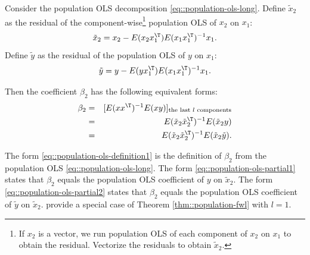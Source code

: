 \begin{theorem}
\label{thm::population-fwl}
Consider the population OLS decomposition \eqref{eq::population-ols-long}. 
Define $\tilde{x}_2$ as the residual of the component-wise\footnote{If $x_2$ is a vector, we run population OLS of each component of $x_2$ on $x_1$ to obtain the residual. Vectorize the residuals to obtain $\tilde{x}_2$.} population OLS of $x_2$ on $x_1$:
$$
\tilde{x}_2 = x_2 - E(x_2 x_1^{\T}) E(x_1 x_1^{\T})^{-1} x_1.
$$
Define $\tilde{y}$ as the residual of the population OLS of $y$ on $x_1$:
$$
\tilde{y} = y - E(y x_1^{\T}) E(x_1 x_1^{\T})^{-1} x_1.
$$

Then the coefficient $\beta_2$ has the following equivalent forms:
\begin{eqnarray}
\beta_2 &=&  [ E(xx^{\T})^{-1} E(xy)]_{\textup{the last $l$ components}} \label{eq::population-ols-definition1} \\
&=& E(\tilde{x}_2\tilde{x}_2^{\T})^{-1} E(\tilde{x}_2 y) \label{eq::population-ols-partial1} \\
&=& E(\tilde{x}_2\tilde{x}_2^{\T})^{-1} E(\tilde{x}_2 \tilde{y}) . \label{eq::population-ols-partial2}
\end{eqnarray} 
\end{theorem}

The form \eqref{eq::population-ols-definition1} is the definition of $\beta_2$ from the population OLS \eqref{eq::population-ols-long}. 
The form \eqref{eq::population-ols-partial1} states that $\beta_2$ equals the population OLS coefficient of $y$ on $\tilde{x}_2$. 
The form \eqref{eq::population-ols-partial2} states that $\beta_2$ equals the population OLS coefficient of $\tilde{y}$ on $\tilde{x}_2$. 
\citet{angrist2008mostly} provide a special case of Theorem \ref{thm::population-fwl} with $l=1$.  



